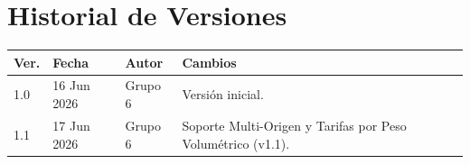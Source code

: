 \documentclass[11pt, a4paper]{article}
\begin{document}
\section{Historial de Versiones}

\begin{table}[h!]
\centering
\begin{tabularx}{\textwidth}{l l l X}
  \toprule
  \textbf{Ver.} & \textbf{Fecha} & \textbf{Autor} & \textbf{Cambios} \\
  \midrule
  1.0 & 16 Jun 2026 & Grupo 6 & Versión inicial. \\
  1.1 & 17 Jun 2026 & Grupo 6 & Soporte Multi-Origen y Tarifas por Peso Volumétrico (v1.1). \\
  \bottomrule
\end{tabularx}
\end{table}
\end{document}
